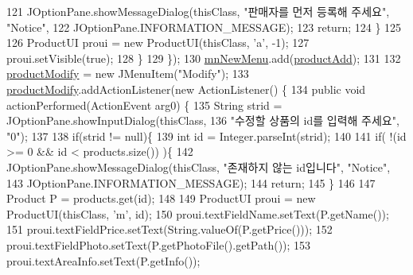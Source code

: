 \begin{DoxyCode}
121                     JOptionPane.showMessageDialog(thisClass, \textcolor{stringliteral}{"판매자를 먼저 등록해 주세요"}, \textcolor{stringliteral}{"Notice"}, 
122                             JOptionPane.INFORMATION\_MESSAGE);
123                     \textcolor{keywordflow}{return};
124                 \}
125                 
126                 ProductUI proui = \textcolor{keyword}{new} ProductUI(thisClass, \textcolor{charliteral}{'a'}, -1);
127                 proui.setVisible(\textcolor{keyword}{true});
128             \}
129         \});
130         \hyperlink{classpkg_1_1_management_u_i_a02082701769fb188544b2211ebc5f759}{mnNewMenu}.add(\hyperlink{classpkg_1_1_management_u_i_afafd026c860294aea147d42bad8ac11f}{productAdd});
131         
132         \hyperlink{classpkg_1_1_management_u_i_a2384d030e607b71538e1f809991b95be}{productModify} = \textcolor{keyword}{new} JMenuItem(\textcolor{stringliteral}{"Modify"});
133         \hyperlink{classpkg_1_1_management_u_i_a2384d030e607b71538e1f809991b95be}{productModify}.addActionListener(\textcolor{keyword}{new} ActionListener() \{
134             \textcolor{keyword}{public} \textcolor{keywordtype}{void} actionPerformed(ActionEvent arg0) \{
135                 String strid = JOptionPane.showInputDialog(thisClass,
136                         \textcolor{stringliteral}{"수정할 상품의 id를 입력해 주세요"}, \textcolor{stringliteral}{"0"});
137                 
138                 \textcolor{keywordflow}{if}(strid != null)\{
139                     \textcolor{keywordtype}{int} \textcolor{keywordtype}{id} = Integer.parseInt(strid);
140                     
141                     \textcolor{keywordflow}{if}( !(\textcolor{keywordtype}{id} >= 0 && \textcolor{keywordtype}{id} < products.size()) )\{
142                         JOptionPane.showMessageDialog(thisClass, \textcolor{stringliteral}{"존재하지 않는 id입니다"}, \textcolor{stringliteral}{"Notice"}, 
143                                 JOptionPane.INFORMATION\_MESSAGE);
144                         \textcolor{keywordflow}{return};
145                     \}
146                     
147                     Product P = products.get(\textcolor{keywordtype}{id});
148                     
149                     ProductUI proui = \textcolor{keyword}{new} ProductUI(thisClass, \textcolor{charliteral}{'m'}, \textcolor{keywordtype}{id});
150                     proui.textFieldName.setText(P.getName());
151                     proui.textFieldPrice.setText(String.valueOf(P.getPrice()));
152                     proui.textFieldPhoto.setText(P.getPhotoFile().getPath());
153                     proui.textAreaInfo.setText(P.getInfo());

\end{DoxyCode}
